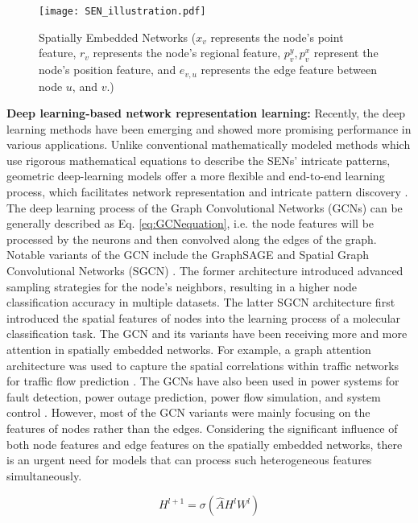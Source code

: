 \begin{figure*}[!htb]
  \centering
  \texttt{[image: SEN\_illustration.pdf]}
  \caption{Spatially Embedded Networks ($x_v$ represents the node's point
    feature, $r_v$ represents the node's regional feature, $p_v^y, p_v^x$
    represent the node's position feature, and $e_{v,u}$ represents the edge
    feature between node $u$, and $v$.)}
  \label{fig: spatially embedded networks}
\end{figure*}


\textbf{Deep learning-based network representation learning:} Recently, the deep
learning methods have been emerging and showed more promising performance in
various applications. Unlike conventional mathematically modeled methods which
use rigorous mathematical equations to describe the SENs' intricate patterns,
geometric deep-learning models offer a more flexible and end-to-end learning
process, which facilitates network representation and intricate pattern
discovery \cite{Ding2024Artificial}. The deep learning process of the Graph
Convolutional Networks (GCNs) can be generally described as
Eq. \ref{eq:GCNequation}, i.e. the node features will be processed by the
neurons and then convolved along the edges of the graph. Notable variants of the
GCN include the GraphSAGE \cite{Hamilton2017Inductive} and Spatial Graph
Convolutional Networks (SGCN) \cite{Danel2020Spatial}. The former architecture
introduced advanced sampling strategies for the node's neighbors, resulting in a
higher node classification accuracy in multiple datasets. The latter SGCN
architecture first introduced the spatial features of nodes into the learning
process of a molecular classification task.  The GCN and its variants have been
receiving more and more attention in spatially embedded networks. For example, a
graph attention architecture was used to capture the spatial correlations within
traffic networks for traffic flow prediction \cite{Wang2023STGIN}. The GCNs have
also been used in power systems for fault detection, power outage prediction,
power flow simulation, and system control \cite{Liao2022Review}. However, most
of the GCN variants were mainly focusing on the features of nodes rather than
the edges. Considering the significant influence of both node features and edge
features on the spatially embedded networks, there is an urgent need for models
that can process such heterogeneous features simultaneously.

\begin{equation}
  \label{eq:GCNequation}
  H^{l+1} = \sigma(\hat{A}H^lW^l)
\end{equation}

